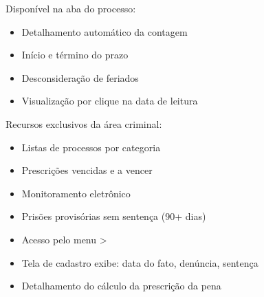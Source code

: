 \documentclass[letterpaper,10pt,brazil]{sphinxmanual}
\begin{document}
\sphinxAtStartPar
{}

\sphinxAtStartPar
Disponível na aba  do processo:
\begin{itemize}
\item {} 
\sphinxAtStartPar
Detalhamento automático da contagem

\item {} 
\sphinxAtStartPar
Início e término do prazo

\item {} 
\sphinxAtStartPar
Desconsideração de feriados

\item {} 
\sphinxAtStartPar
Visualização por clique na data de leitura

\end{itemize}

\sphinxAtStartPar
{}

\sphinxAtStartPar
Recursos exclusivos da área criminal:
\begin{itemize}
\item {} 
\sphinxAtStartPar
Listas de processos por categoria

\item {} 
\sphinxAtStartPar
Prescrições vencidas e a vencer

\item {} 
\sphinxAtStartPar
Monitoramento eletrônico

\item {} 
\sphinxAtStartPar
Prisões provisórias sem sentença (90+ dias)

\end{itemize}

\sphinxAtStartPar
{}
\begin{itemize}
\item {} 
\sphinxAtStartPar
Acesso pelo menu  \textgreater{} 

\item {} 
\sphinxAtStartPar
Tela de cadastro exibe: data do fato, denúncia, sentença

\item {} 
\sphinxAtStartPar
Detalhamento do cálculo da prescrição da pena

\end{itemize}

\sphinxstepscope
\end{document}
